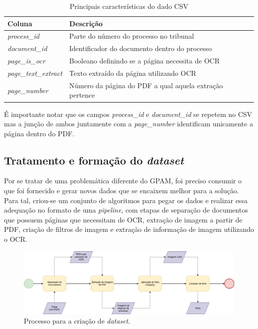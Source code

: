 
\begin{table}[h]
 \centering
 \caption{Principais características do dado CSV}
 \begin{tabular}{|m{9em}|m{20em}|}
    \hline
      \textbf{Coluna}  &
      \textbf{Descrição} \\
    \hline
      \textit{process\_id}  &
      Parte do número do processo no tribunal \\
    \hline
      \textit{document\_id}  &
      Identificador do documento dentro do processo \\
    \hline
      \textit{page\_is\_ocr}  &
      Booleano definindo se a página necessita de OCR \\
    \hline
      \textit{page\_text\_extract} &
      Texto extraído da página utilizando OCR \\
    \hline
      \textit{page\_number} &
      Número da página do PDF a qual aquela extração pertence \\
    \hline
 \end{tabular}
 \label{tab:csv-details}
\end{table}

É importante notar que os campos \textit{process\_id} e \textit{document\_id} se repetem no CSV mas a junção de ambos juntamente com a \textit{page\_number} identificam unicamente a página dentro do PDF.

\subsection{Tratamento e formação do \textit{dataset}}

Por se tratar de uma problemática diferente do GPAM, foi preciso consumir o que foi fornecido e gerar novos dados que se encaixem melhor para a solução. Para tal, criou-se um conjunto de algoritmos para pegar os dados e realizar essa adequação no formato de uma \textit{pipeline}, com etapas de separação de documentos que possuem páginas que necessitam de OCR, extração de imagem a partir de PDF, criação de filtros de imagem e extração de informação de imagem utilizando o OCR.
\\

\begin{figure}[H]
  \centering
  \caption{Processo para a criação de \textit{dataset}.}
  \includegraphics[width=\linewidth, rotate=0]{figuras/crappy-flow-diagram.png}
\end{figure}

